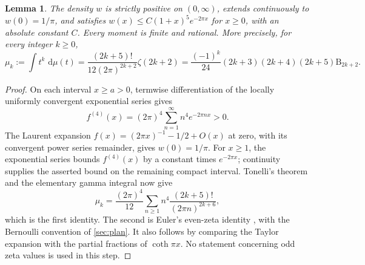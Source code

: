 \documentclass[11pt,letterpaper]{article}
\newtheorem{lemma}[lemma]{Lemma}
\theoremstyle{definition}
\newcommand{\dd}{\,\mathrm d}
\begin{document}
\begin{lemma}\label{lem:positive-measure}
The density $w$ is strictly positive on $(0,\infty)$, extends continuously
to $w(0)=1/\pi$, and satisfies
$w(x)\le C(1+x)^5e^{-2\pi x}$ for $x\ge0$, with an absolute constant $C$.
Every moment is finite and rational. More precisely, for every integer
$k\ge0$,
\begin{equation}\label{eq:rational-moments}
 \mu_k:=\int t^k\,\dd\mu(t)
 =\frac{(2k+5)!}{12(2\pi)^{2k+2}}\zeta(2k+2)
 =\frac{(-1)^k}{24}(2k+3)(2k+4)(2k+5)\mathrm B_{2k+2}.
\end{equation}
\end{lemma}
\begin{proof}
On each interval $x\ge a>0$, termwise differentiation of the locally
uniformly convergent exponential series gives
\[
 f^{(4)}(x)=(2\pi)^4\sum_{n=1}^{\infty}n^4e^{-2\pi nx}>0.
\]
The Laurent expansion $f(x)=(2\pi x)^{-1}-1/2+O(x)$ at zero, with its
convergent power series remainder, gives $w(0)=1/\pi$. For $x\ge1$, the
exponential series bounds $f^{(4)}(x)$ by a constant times $e^{-2\pi x}$;
continuity supplies the asserted bound on the remaining compact interval.
Tonelli's theorem and the elementary gamma integral now give
\[
 \mu_k=\frac{(2\pi)^4}{12}
 \sum_{n\ge1}n^4\frac{(2k+5)!}{(2\pi n)^{2k+6}},
\]
which is the first identity. The second is Euler's even-zeta identity
\cite[\S25.6.2]{dlmf}, with the Bernoulli convention of
\cref{sec:plan}. It also follows by comparing the Taylor expansion with
the partial fractions of $\coth\pi x$. No statement concerning odd zeta
values is used in this step.
\end{proof}
\end{document}
